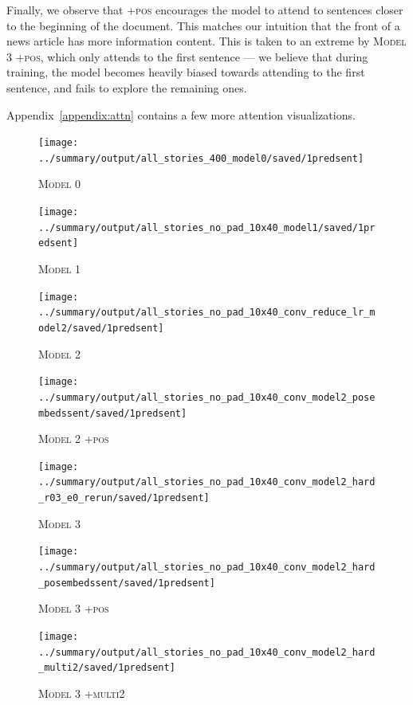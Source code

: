 \documentclass[12pt]{report}
\begin{document}
Finally, we observe that \textsc{+pos} encourages the model to attend to sentences closer to the beginning of the document. This matches our intuition that the front of a news article has more information content. This is taken to an extreme by \textsc{Model 3 +pos}, which only attends to the first sentence --- we believe that during training, the model becomes heavily biased towards attending to the first sentence, and fails to explore the remaining ones.

Appendix~\ref{appendix:attn} contains a few more attention visualizations.


\begin{figure}[p]
\centering
\texttt{[image: ../summary/output/all\_stories\_400\_model0/saved/1predsent]}
\caption[\textsc{Model 0} Attention]{\textsc{Model 0}}
\label{fig:first_attn}
\end{figure}

\begin{figure}[p]
\centering
\texttt{[image: ../summary/output/all\_stories\_no\_pad\_10x40\_model1/saved/1predsent]}
\caption[\textsc{Model 1} Attention]{\textsc{Model 1}}
\end{figure}

\begin{figure}[p]
\centering
\texttt{[image: ../summary/output/all\_stories\_no\_pad\_10x40\_conv\_reduce\_lr\_model2/saved/1predsent]}
\caption[\textsc{Model 2} Attention]{\textsc{Model 2}}
\end{figure}

\begin{figure}[p]
\centering
\texttt{[image: ../summary/output/all\_stories\_no\_pad\_10x40\_conv\_model2\_posembedssent/saved/1predsent]}
\caption[\textsc{Model 2 +pos} Attention]{\textsc{Model 2 +pos}}
\end{figure}

\begin{figure}[p]
\centering
\texttt{[image: ../summary/output/all\_stories\_no\_pad\_10x40\_conv\_model2\_hard\_r03\_e0\_rerun/saved/1predsent]}
\caption[\textsc{Model 3} Attention]{\textsc{Model 3}}
\end{figure}

\begin{figure}[p]
\centering
\texttt{[image: ../summary/output/all\_stories\_no\_pad\_10x40\_conv\_model2\_hard\_posembedssent/saved/1predsent]}
\caption[\textsc{Model 3 +pos} Attention]{\textsc{Model 3 +pos}}
\end{figure}

\begin{figure}[p]
\centering
\texttt{[image: ../summary/output/all\_stories\_no\_pad\_10x40\_conv\_model2\_hard\_multi2/saved/1predsent]}
\caption[\textsc{Model 3 +multi2} Attention]{\textsc{Model 3 +multi2}}
\end{figure}
\end{document}
